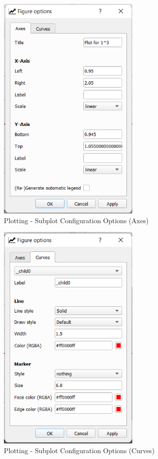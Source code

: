 \documentclass[a4paper, oneside, 11pt]{report}
\begin{document}
\begin{figure}[h!]
    \centering
    \includegraphics[width=7.0cm]{plottingParameters1.png}
    \caption{Plotting - Subplot Configuration Options (Axes)}
    \label{fig:bnf}
\end{figure}

\begin{figure}[h!]
    \centering
    \includegraphics[width=7.0cm]{plottingParameters2.png}
    \caption{Plotting - Subplot Configuration Options (Curves)}
    \label{fig:bnf}
\end{figure}
\FloatBarrier
\end{document}
